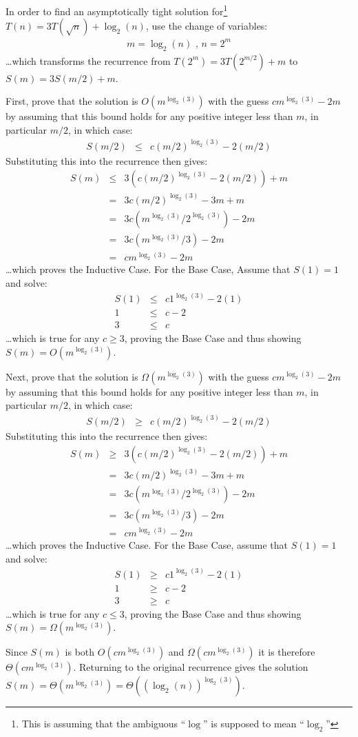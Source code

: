 In order to find an asymptotically tight solution for\footnote{This is assuming that the ambiguous ``$\log$'' is supposed to mean ``$\log_2$''} $T(n) = 3T(\sqrt{n}) + \log_2(n)$, use the change of variables:
\begin{eqnarray*}
	m = \log_2(n) \text{ , } n = 2^m
\end{eqnarray*}
\ldots which transforms the recurrence from $T(2^m) = 3T(2^{m/2}) + m$ to $S(m) = 3S(m/2) + m$.

First, prove that the solution is $O(m^{\log_2(3)})$ with the guess $cm^{\log_2(3)} - 2m$ by assuming that this bound holds for any positive integer less than $m$, in particular $m/2$, in which case:
\begin{eqnarray*}
	S(m/2) &\leq& c(m/2)^{\log_2(3)} - 2(m/2)
\end{eqnarray*}
Substituting this into the recurrence then gives:
\begin{eqnarray*}
	S(m) &\leq& 3(c(m/2)^{\log_2(3)} - 2(m/2)) + m \\
	 &=& 3c(m/2)^{\log_2(3)} - 3m + m \\
	 &=& 3c(m^{\log_2(3)}/2^{\log_2(3)}) - 2m \\
	 &=& 3c(m^{\log_2(3)}/3) - 2m \\
	 &=& cm^{\log_2(3)} - 2m
\end{eqnarray*}
\ldots which proves the Inductive Case.  For the Base Case, Assume that $S(1) = 1$ and solve:
\begin{eqnarray*}
	S(1) &\leq& c1^{\log_2(3)} - 2(1) \\
	1 &\leq& c - 2 \\
	3 &\leq& c
\end{eqnarray*}
\ldots which is true for any $c \geq 3$, proving the Base Case and thus showing $S(m) = O(m^{\log_2(3)})$.

Next, prove that the solution is $\Omega(m^{\log_2(3)})$ with the guess $cm^{\log_2(3)} - 2m$ by assuming that this bound holds for any positive integer less than $m$, in particular $m/2$, in which case:
\begin{eqnarray*}
	S(m/2) &\geq& c(m/2)^{\log_2(3)} - 2(m/2)
\end{eqnarray*}
Substituting this into the recurrence then gives:
\begin{eqnarray*}
	S(m) &\geq& 3(c(m/2)^{\log_2(3)} - 2(m/2)) + m \\
	 &=& 3c(m/2)^{\log_2(3)} - 3m + m \\
	 &=& 3c(m^{\log_2(3)}/2^{\log_2(3)}) - 2m \\
	 &=& 3c(m^{\log_2(3)}/3) - 2m \\
	 &=& cm^{\log_2(3)} - 2m
\end{eqnarray*}
\ldots which proves the Inductive Case.  For the Base Case, assume that $S(1) = 1$ and solve:
\begin{eqnarray*}
	S(1) &\geq& c1^{\log_2(3)} - 2(1) \\
	1 &\geq& c - 2 \\
	3 &\geq& c
\end{eqnarray*}
\ldots which is true for any $c \leq 3$, proving the Base Case and thus showing $S(m) = \Omega(m^{\log_2(3)})$.

Since $S(m)$ is both $O(cm^{\log_2(3)})$ and $\Omega(cm^{\log_2(3)})$ it is therefore $\Theta(cm^{\log_2(3)})$.  Returning to the original recurrence gives the solution $S(m) = \Theta(m^{\log_2(3)}) = \Theta((\log_2(n))^{\log_2(3)})$.

